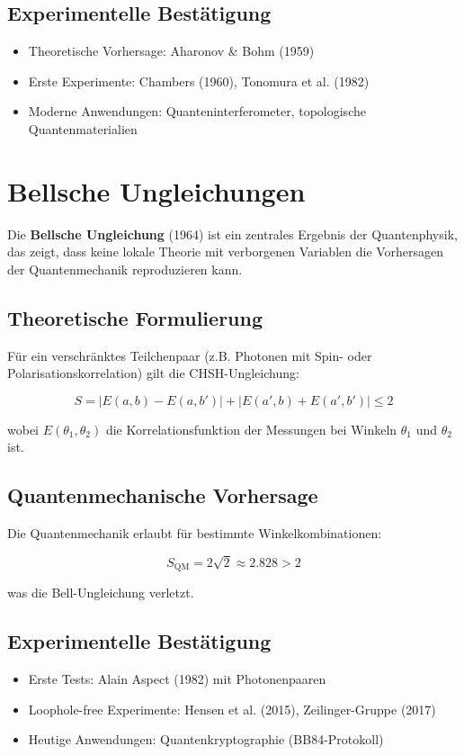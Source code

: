 \subsection{Experimentelle Bestätigung}
\begin{itemize}
\item Theoretische Vorhersage: Aharonov \& Bohm (1959)
\item Erste Experimente: Chambers (1960), Tonomura et al. (1982)
\item Moderne Anwendungen: Quanteninterferometer, topologische Quantenmaterialien
\end{itemize}

\section{Bellsche Ungleichungen}
\label{sec:bell}

Die \textbf{Bellsche Ungleichung} (1964) ist ein zentrales Ergebnis der Quantenphysik, das zeigt, dass keine lokale Theorie mit verborgenen Variablen die Vorhersagen der Quantenmechanik reproduzieren kann.

\subsection{Theoretische Formulierung}
Für ein verschränktes Teilchenpaar (z.B. Photonen mit Spin- oder Polarisationskorrelation) gilt die CHSH-Ungleichung:

\begin{equation}
S = |E(a,b) - E(a,b')| + |E(a',b) + E(a',b')| \leq 2
\end{equation}

wobei $E(\theta_1, \theta_2)$ die Korrelationsfunktion der Messungen bei Winkeln $\theta_1$ und $\theta_2$ ist.

\subsection{Quantenmechanische Vorhersage}
Die Quantenmechanik erlaubt für bestimmte Winkelkombinationen:

\begin{equation}
S_{\text{QM}} = 2\sqrt{2} \approx 2.828 > 2
\end{equation}

was die Bell-Ungleichung verletzt.

\subsection{Experimentelle Bestätigung}
\begin{itemize}
\item Erste Tests: Alain Aspect (1982) mit Photonenpaaren
\item Loophole-free Experimente: Hensen et al. (2015), Zeilinger-Gruppe (2017)
\item Heutige Anwendungen: Quantenkryptographie (BB84-Protokoll)
\end{itemize}

